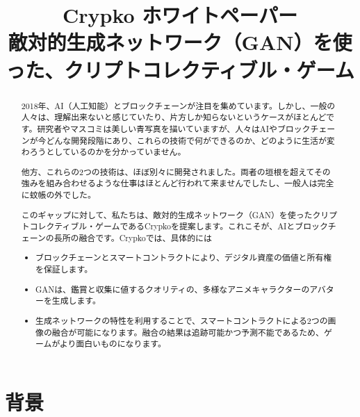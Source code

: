 \documentclass[a4paper]{article}
\title{Crypko ホワイトペーパー\\
  \large 敵対的生成ネットワーク（GAN）を使った、クリプトコレクティブル・ゲーム\\
  \rightline{\small ver 0.8.0}
}
\author{}
\date{}
\begin{document}
\maketitle

\renewcommand\abstractname{概　要}
\begin{abstract}

2018年、AI（人工知能）とブロックチェーンが注目を集めています。しかし、一般の人々は、理解出来ないと感じていたり、片方しか知らないというケースがほとんどです。研究者やマスコミは美しい青写真を描いていますが、人々はAIやブロックチェーンが今どんな開発段階にあり、これらの技術で何ができるのか、どのように生活が変わろうとしているのかを分かっていません。

他方、これらの2つの技術は、ほぼ別々に開発されました。両者の垣根を超えてその強みを組み合わせるような仕事はほとんど行われて来ませんでしたし、一般人は完全に蚊帳の外でした。

このギャップに対して、私たちは、敵対的生成ネットワーク（GAN）を使ったクリプトコレクティブル・ゲームであるCrypkoを提案します。これこそが、AIとブロックチェーンの長所の融合です。Crypkoでは、具体的には
\begin{itemize}
\item ブロックチェーンとスマートコントラクトにより、デジタル資産の価値と所有権を保証します。
\item GANは、鑑賞と収集に値するクオリティの、多様なアニメキャラクターのアバターを生成します。
\item 生成ネットワークの特性を利用することで、スマートコントラクトによる2つの画像の融合が可能になります。融合の結果は追跡可能かつ予測不能であるため、ゲームがより面白いものになります。
\end{itemize}

\end{abstract}

\thispagestyle{empty}

\newpage

\section{背景}
\end{document}
